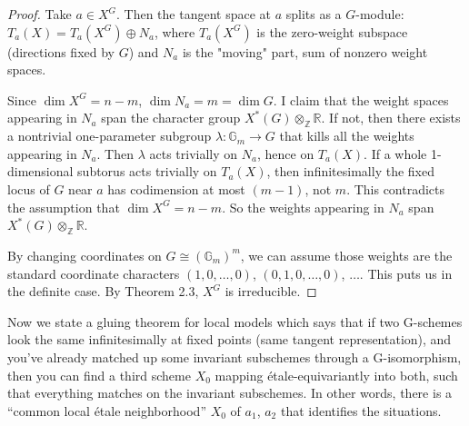 \documentclass[12pt]{article}
\begin{document}
\begin{proof}
Take $a \in X^G$. Then the tangent space at $a$ splits as a $G$-module:
$T_a(X) = T_a(X^G) \oplus N_a$, where $T_a(X^G)$ is the zero-weight subspace (directions fixed by $G$) and $N_a$ is the "moving" part, sum of nonzero weight spaces.

Since $\dim X^G = n-m$, $\dim N_a = m = \dim G$. I claim that the weight spaces appearing in $N_a$ span the character group $X^*(G)\otimes_\mathbb{Z} \mathbb{R}$. If not, then there exists a nontrivial one-parameter subgroup $\lambda: \mathbb{G}_m \to G$ that kills all the weights appearing in $N_a$. Then $\lambda$ acts trivially on $N_a$, hence on $T_a(X)$. If a whole 1-dimensional subtorus acts trivially on $T_a(X)$, then infinitesimally the fixed locus of $G$ near $a$ has codimension at most $(m-1)$, not $m$. This contradicts the assumption that $\dim X^G = n-m$. So the weights appearing in $N_a$ span $X^*(G)\otimes_\mathbb{Z} \mathbb{R}$.

By changing coordinates on $G \cong (\mathbb{G}_m)^m$, we can assume those weights are the standard coordinate characters $(1,0,\dots,0)$, $(0,1,0,\dots,0)$, $\dots$. This puts us in the definite case. By Theorem 2.3, $X^G$ is irreducible.\end{proof}

Now we state a gluing theorem for local models which says that if two G-schemes look the same infinitesimally at fixed points (same tangent representation), and you’ve already matched up some invariant subschemes through a G-isomorphism, then you can find a third scheme $X_0$ mapping étale-equivariantly into both, such that everything matches on the invariant subschemes. In other words, there is a “common local étale neighborhood” $X_0$ of $a_1$, $a_2$ that identifies the situations.
\end{document}
